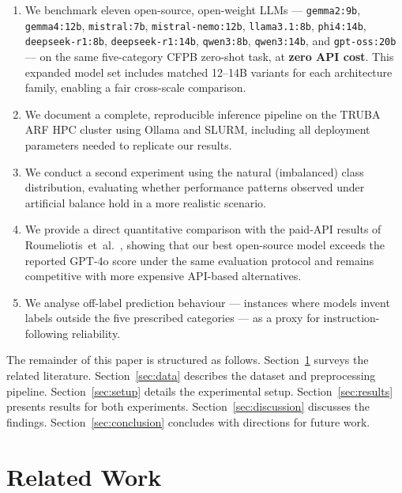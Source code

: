 \documentclass[journal]{IEEEtran}
\begin{document}
\begin{enumerate}
  \item We benchmark eleven open-source, open-weight LLMs —
        \texttt{gemma2:9b}, \texttt{gemma4:12b}, \texttt{mistral:7b},
        \texttt{mistral-nemo:12b}, \texttt{llama3.1:8b}, \texttt{phi4:14b},
        \texttt{deepseek-r1:8b}, \texttt{deepseek-r1:14b},
        \texttt{qwen3:8b}, \texttt{qwen3:14b}, and \texttt{gpt-oss:20b}
        — on the same five-category CFPB zero-shot task, at
        \textbf{zero API cost}. This expanded model set includes matched
        12--14B variants for each architecture family, enabling a fair
        cross-scale comparison.

  \item We document a complete, reproducible inference pipeline on the
        TRUBA ARF HPC cluster using Ollama and SLURM, including
        all deployment parameters needed to replicate our results.

  \item We conduct a second experiment using the natural (imbalanced)
        class distribution, evaluating whether performance patterns
        observed under artificial balance hold in a more realistic
        scenario.

  \item We provide a direct quantitative comparison with the paid-API
        results of Roumeliotis~et~al.\ \cite{roumeliotis2025think},
        showing that our best open-source model exceeds the reported
        GPT-4o score under the same evaluation protocol and remains
        competitive with more expensive API-based alternatives.

  \item We analyse off-label prediction behaviour — instances where
        models invent labels outside the five prescribed categories —
        as a proxy for instruction-following reliability.
\end{enumerate}

The remainder of this paper is structured as follows.
Section~\ref{sec:related} surveys the related literature.
Section~\ref{sec:data} describes the dataset and preprocessing
pipeline. Section~\ref{sec:setup} details the experimental setup.
Section~\ref{sec:results} presents results for both experiments.
Section~\ref{sec:discussion} discusses the findings.
Section~\ref{sec:conclusion} concludes with directions for future work.


\section{Related Work}
\label{sec:related}
\end{document}
